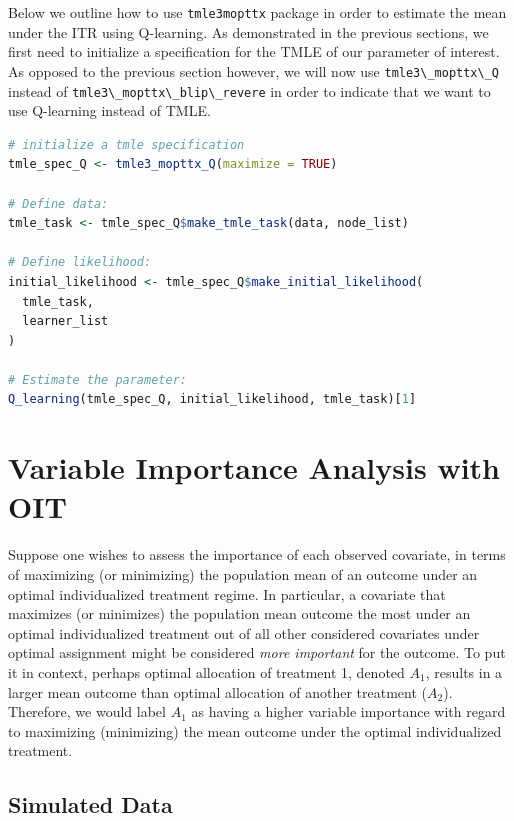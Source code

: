 \documentclass[12pt, krantz2,]{krantz}
\newcommand{\passthrough}[1]{#1}
\theoremstyle{definition}
\theoremstyle{definition}
\theoremstyle{definition}
\newcommand{\1}{\mathbbm{1}}
\begin{document}
Below we outline how to use \passthrough{\lstinline!tmle3mopttx!} package in order to estimate the mean
under the ITR using Q-learning. As demonstrated in the previous sections, we
first need to initialize a specification for the TMLE of our parameter of
interest. As opposed to the previous section however, we will now use
\passthrough{\lstinline!tmle3\_mopttx\_Q!} instead of \passthrough{\lstinline!tmle3\_mopttx\_blip\_revere!} in order to indicate that
we want to use Q-learning instead of TMLE.

\begin{lstlisting}[language=R]
# initialize a tmle specification
tmle_spec_Q <- tmle3_mopttx_Q(maximize = TRUE)

# Define data:
tmle_task <- tmle_spec_Q$make_tmle_task(data, node_list)

# Define likelihood:
initial_likelihood <- tmle_spec_Q$make_initial_likelihood(
  tmle_task,
  learner_list
)

# Estimate the parameter:
Q_learning(tmle_spec_Q, initial_likelihood, tmle_task)[1]
\end{lstlisting}

\hypertarget{variable-importance-analysis-with-oit}{%
\section{Variable Importance Analysis with OIT}\label{variable-importance-analysis-with-oit}}

Suppose one wishes to assess the importance of each observed covariate, in
terms of maximizing (or minimizing) the population mean of an outcome under an
optimal individualized treatment regime. In particular, a covariate that
maximizes (or minimizes) the population mean outcome the most under an optimal
individualized treatment out of all other considered covariates under optimal
assignment might be considered \emph{more important} for the outcome. To put it in
context, perhaps optimal allocation of treatment 1, denoted \(A_1\), results in a
larger mean outcome than optimal allocation of another treatment (\(A_2\)).
Therefore, we would label \(A_1\) as having a higher variable importance with
regard to maximizing (minimizing) the mean outcome under the optimal
individualized treatment.

\hypertarget{simulated-data-2}{%
\subsection{Simulated Data}\label{simulated-data-2}}
\end{document}
